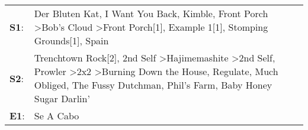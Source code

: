 \begin{supertabular}{p{0.03\textwidth}p{0.92\textwidth}}
 \textbf{S1}:  &                                                                                                                                                              Der Bluten Kat\textsuperscript{}, \enspace I Want You Back\textsuperscript{}, \enspace Kimble\textsuperscript{}, \enspace Front Porch\textsuperscript{} \textgreater \enspace Bob's Cloud\textsuperscript{} \textgreater \enspace Front Porch[1]\textsuperscript{}, \enspace Example 1[1]\textsuperscript{}, \enspace Stomping Grounds[1]\textsuperscript{}, \enspace Spain\textsuperscript{}  \enspace  \\
 \textbf{S2}:  &  Trenchtown Rock[2]\textsuperscript{}, \enspace 2nd Self\textsuperscript{} \textgreater \enspace Hajimemashite\textsuperscript{} \textgreater \enspace 2nd Self\textsuperscript{}, \enspace Prowler\textsuperscript{} \textgreater \enspace 2x2\textsuperscript{} \textgreater \enspace Burning Down the House\textsuperscript{}, \enspace Regulate\textsuperscript{}, \enspace Much Obliged\textsuperscript{}, \enspace The Fussy Dutchman\textsuperscript{}, \enspace Phil's Farm\textsuperscript{}, \enspace Baby Honey Sugar Darlin'\textsuperscript{}  \enspace  \\
 \textbf{E1}:  &                                                                                                                                                                                                                                                                                                                                                                                                                                                                                                                                Se A Cabo\textsuperscript{}  \enspace  \\
\end{supertabular}
